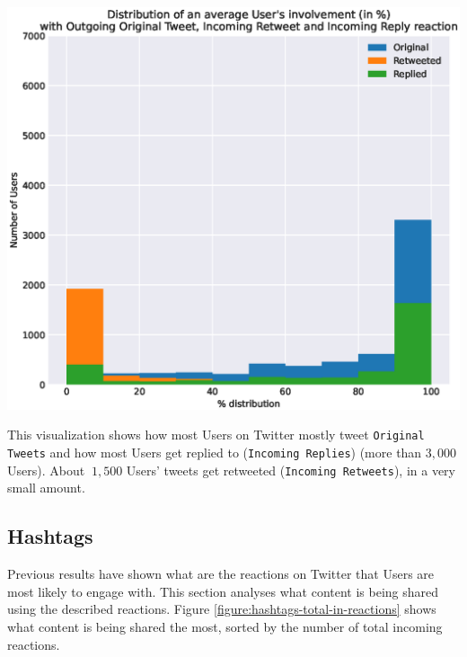\begin{center}
\includegraphics[width=16cm,keepaspectratio]{figures/users-reaction-distribution.eps}
\label{figure:users-reaction-distribution}
\end{center}

This visualization shows how most Users on Twitter mostly tweet \texttt{Original Tweets} and how most Users get replied to (\texttt{Incoming Replies}) (more than \(3,000\) Users). About \(~1,500\) Users' tweets get retweeted (\texttt{Incoming Retweets}), in a very small amount.

\subsection{Hashtags}
\label{sec:results-hashtags}

Previous results have shown what are the reactions on Twitter that Users are most likely to engage with. This section analyses what content is being shared using the described reactions. Figure \ref{figure:hashtags-total-in-reactions} shows what content is being shared the most, sorted by the number of total incoming reactions.


